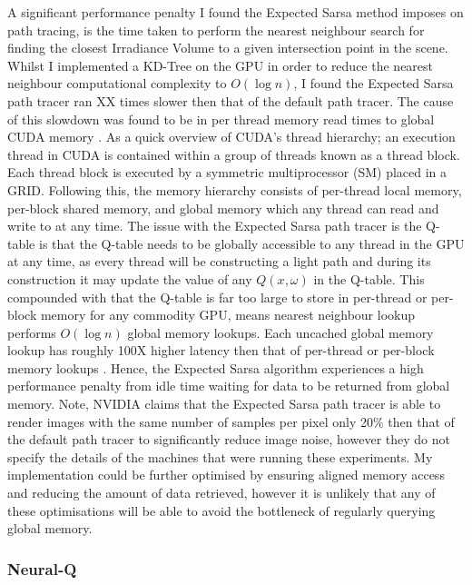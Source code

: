 \documentclass[../dissertation.tex]{subfiles}
\begin{document}
A significant performance penalty I found the Expected Sarsa method imposes on path tracing, is the time taken to perform the nearest neighbour search for finding the closest Irradiance Volume to a given intersection point in the scene. Whilst I implemented a KD-Tree on the GPU in order to reduce the nearest neighbour computational complexity to $O( \log n)$, I found the Expected Sarsa path tracer ran XX times slower then that of the default path tracer. The cause of this slowdown was found to be in per thread memory read times to global CUDA memory \cite{cuda_c_guide}. As a quick overview of CUDA's thread hierarchy; an execution thread in CUDA is contained within a group of threads known as a thread block. Each thread block is executed by a symmetric multiprocessor (SM) placed in a GRID. Following this, the memory hierarchy consists of per-thread local memory, per-block shared memory, and global memory which any thread can read and write to at any time. The issue with the Expected Sarsa path tracer is the Q-table is that the Q-table needs to be globally accessible to any thread in the GPU at any time, as every thread will be constructing a light path and during its construction it may update the value of any $Q(x, \omega)$ in the Q-table. This compounded with that the Q-table is far too large to store in per-thread or per-block memory for any commodity GPU, means nearest neighbour lookup performs $O(\log n)$ global memory lookups. Each uncached global memory lookup has roughly 100X higher latency then that of per-thread or per-block memory lookups \cite{global_vs_shared}. Hence, the Expected Sarsa algorithm experiences a high performance penalty from idle time waiting for data to be returned from global memory. Note, NVIDIA claims that the Expected Sarsa path tracer is able to render images with the same number of samples per pixel only 20\% then that of the default path tracer \cite{dahm2017learning} to significantly reduce image noise, however they do not specify the details of the machines that were running these experiments. My implementation could be further optimised by ensuring aligned memory access and reducing the amount of data retrieved, however it is unlikely that any of these optimisations will be able to avoid the bottleneck of regularly querying global memory.\\

\subsubsection{Neural-Q}
\end{document}
